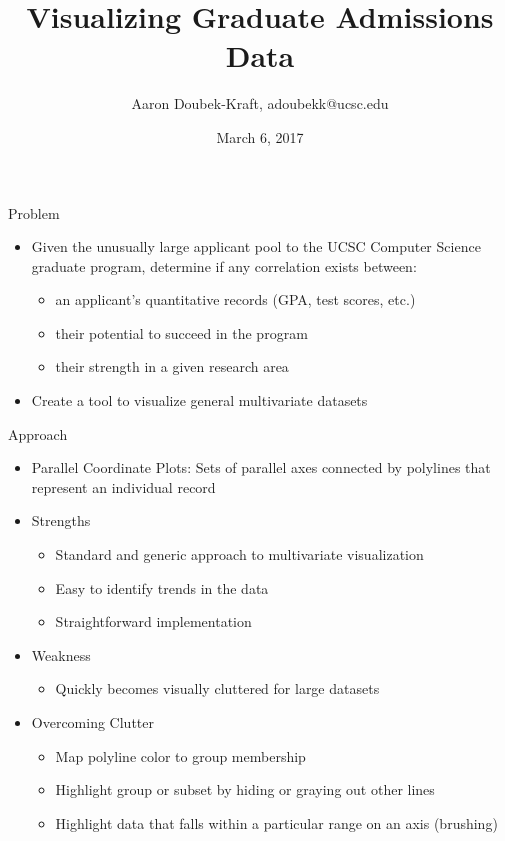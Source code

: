 \documentclass{beamer}
\title{Visualizing Graduate Admissions Data}
\author{Aaron Doubek-Kraft, adoubekk@ucsc.edu}
\date{March 6, 2017}
\begin{document}
	
	\frame{\titlepage}
	
	\begin{frame}{Problem}
		\begin{itemize}
			\item Given the unusually large applicant pool to the UCSC Computer Science graduate program, determine if any correlation exists between:
			\begin{itemize} \item an applicant's quantitative records (GPA, test scores, etc.) 
							\item their potential to succeed in the program
							\item their strength in a given research area
			\end{itemize}
			\item Create a tool to visualize general multivariate datasets
		\end{itemize}	
	\end{frame}
	
	\begin{frame}{Approach}
		\begin{itemize}
			\item Parallel Coordinate Plots: Sets of parallel axes connected by polylines that represent an individual record
			\item Strengths
			\begin{itemize}
				\item Standard and generic approach to multivariate visualization
				\item Easy to identify trends in the data
				\item Straightforward implementation
			\end{itemize}
			\item Weakness
			\begin{itemize}
				\item Quickly becomes visually cluttered for large datasets
			\end{itemize}
			\item Overcoming Clutter
			\begin{itemize}
				\item Map polyline color to group membership
				\item Highlight group or subset by hiding or graying out other lines
				\item Highlight data that falls within a particular range on an axis (brushing)
			\end{itemize}
		\end{itemize}
	
	\end{frame}
	
\end{document}
